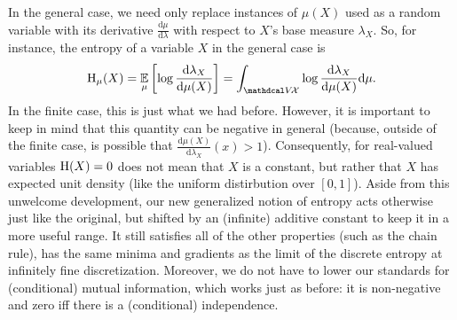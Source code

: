 In the general case, we need only replace instances of $\mu(X)$ used as a random variable with its derivative $\frac{\mathrm d\mu}{\mathrm d \lambda}$ with respect to $X$'s base measure $\lambda_X$.
So, for instance, the entropy of a variable $X$ in the general case is
\begin{equation}
    \H_\mu(X) 
    = \Ex_{\mu} \left[
        \log \frac{\mathrm d\lambda_X}{\mathrm d \mu(X)} \right]
    = \int_{\V\!\X} \log \frac{\mathrm d\lambda_X}{\mathrm d \mu(X)} \mathrm d \mu
    .
    \label{eq:gen-entropy}
\end{equation}
In the finite case, this is just what we had before. 
However, it is important to keep in mind that this quantity can be negative in general (because, outside of the finite case, is possible that $\frac{\mathrm d \mu(X)}{\mathrm d \lambda_X}(x) > 1$). 
Consequently, for real-valued variables $\operatorname{\mathrm{H}}(X) = 0$ does not mean that $X$ is a constant, but rather that $X$ has expected unit density (like the uniform distirbution over $[0,1]$). 
Aside from this unwelcome development, our new generalized notion of entropy acts otherwise just like the original, but shifted by an (infinite) additive constant to keep it in a more useful range.
It still satisfies all of the other properties (such as the chain rule), has the same minima and gradients as the limit of the discrete entropy at infinitely fine discretization.  
Moreover, we do not have to lower our standards for 
    (conditional) mutual information, which works just as before:
    it is non-negative and zero iff there is a (conditional) independence. 






